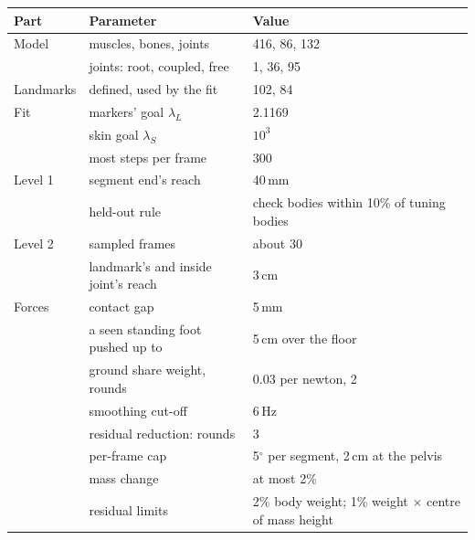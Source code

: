 \documentclass[11pt]{article}
\newcommand{\dg}{\ensuremath{^\circ}}
\begin{document}
\begin{center}\small
{}
\begin{tabular}{@{}lll@{}}
\toprule
Part & Parameter & Value \\
\midrule
Model & muscles, bones, joints & 416, 86, 132 \\
 & joints: root, coupled, free & 1, 36, 95 \\
Landmarks & defined, used by the fit & 102, 84 \\
Fit & markers' goal $\lambda_L$ & 2.1169 \\
 & skin goal $\lambda_S$ & $10^3$ \\
 & most steps per frame & 300 \\
Level 1 & segment end's reach & 40\,mm \\
 & held-out rule & check bodies within 10\% of tuning bodies \\
Level 2 & sampled frames & about 30 \\
 & landmark's and inside joint's reach & 3\,cm \\
Forces & contact gap & 5\,mm \\
 & a seen standing foot pushed up to & 5\,cm over the floor \\
 & ground share weight, rounds & 0.03 per newton, 2 \\
 & smoothing cut-off & 6\,Hz \\
 & residual reduction: rounds & 3 \\
 & \quad per-frame cap & 5\dg{} per segment, 2\,cm at the pelvis \\
 & \quad mass change & at most 2\% \\
 & residual limits & 2\% body weight; 1\% weight $\times$ centre of mass height \\
\bottomrule
\end{tabular}
\end{center}
\end{document}
